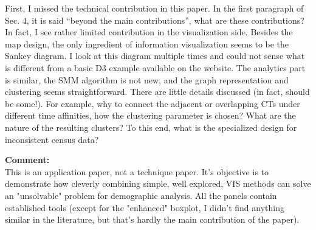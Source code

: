 \documentclass{article}
\newcommand{\reply}[1]{\begin{tcolorbox}\noindent\textbf{Comment:}\\#1\hfill\end{tcolorbox}}
\begin{document}
\begin{itemize}
{{    First, I missed the technical contribution in this paper. In the first paragraph
    of Sec. 4, it is said ``beyond the main contributions'', what are these
    contributions? In fact, I see rather limited contribution in the visualization
    side. Besides the map design, the only ingredient of information visualization
    seems to be the Sankey diagram. I look at this diagram multiple times and could
    not sense what is different from a basic D3 example available on the website. The
    analytics part is similar, the SMM algorithm is not new, and the graph
    representation and clustering seems straightforward. There are little details
    discussed (in fact, should be some!). For example, why to connect the adjacent or
    overlapping CTs under different time affinities, how the clustering parameter is
    chosen? What are the nature of the resulting clusters? To this end, what is the
    specialized design for inconsistent census data?

    \reply{This is an application paper, not a technique paper. It's objective
    is to demonstrate how cleverly combining simple, well explored, VIS methods
    can solve an "unsolvable" problem for demographic analysis. All the panels
    contain established tools (except for the "enhanced" boxplot, I didn't find
    anything similar in the literature, but that's hardly the main contribution
    of the paper).}


}}
\end{itemize}
\end{document}
